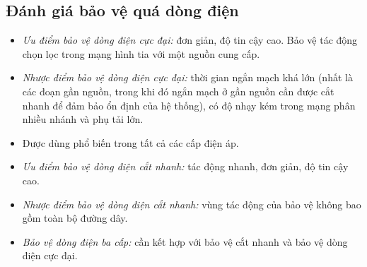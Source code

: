 \documentclass[12pt,a4paper]{article}
\begin{document}
\subsection{Đánh giá bảo vệ quá dòng điện}
	\begin{itemize}
		\item \emph{Ưu điểm bảo vệ dòng điện cực đại:} đơn giản, độ tin cậy cao. Bảo vệ tác động chọn lọc trong mạng hình tia với một nguồn cung cấp.
		
		\item \emph{Nhược điểm bảo vệ dòng điện cực đại:} thời gian ngắn mạch khá lớn (nhất là các đoạn gần nguồn, trong khi đó ngắn mạch ở gần nguồn cần được cắt nhanh để đảm bảo ổn định của hệ thống), có độ nhạy kém trong mạng phân nhiều nhánh và phụ tải lớn.
		
		\item Được dùng phổ biến trong tất cả các cấp điện áp.
		
		\item \emph{Ưu điểm bảo vệ dòng điện cắt nhanh:} tác động nhanh, đơn giản, độ tin cậy cao.
		
		\item \emph{Nhược điểm bảo vệ dòng điện cắt nhanh:} vùng tác động của bảo vệ không bao gồm toàn bộ đường dây.
		
		\item \emph{Bảo vệ dòng điện ba cấp:} cần kết hợp với bảo vệ cắt nhanh và bảo vệ dòng điện cực đại.
	\end{itemize}
	
\newpage
\end{document}
